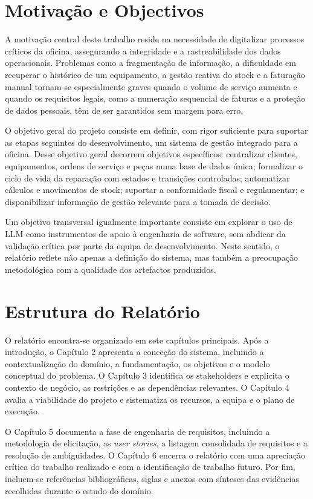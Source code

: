 \documentclass[a4paper,12pt]{scrreprt}
\begin{document}
    \section{Motivação e Objectivos}
        A motivação central deste trabalho reside na necessidade de digitalizar processos críticos da oficina, assegurando a integridade e a rastreabilidade dos dados operacionais. Problemas como a fragmentação de informação, a dificuldade em recuperar o histórico de um equipamento, a gestão reativa do stock e a faturação manual tornam-se especialmente graves quando o volume de serviço aumenta e quando os requisitos legais, como a numeração sequencial de faturas e a proteção de dados pessoais, têm de ser garantidos sem margem para erro.

        O objetivo geral do projeto consiste em definir, com rigor suficiente para suportar as etapas seguintes do desenvolvimento, um sistema de gestão integrado para a oficina. Desse objetivo geral decorrem objetivos específicos: centralizar clientes, equipamentos, ordens de serviço e peças numa base de dados única; formalizar o ciclo de vida da reparação com estados e transições controladas; automatizar cálculos e movimentos de stock; suportar a conformidade fiscal e regulamentar; e disponibilizar informação de gestão relevante para a tomada de decisão.

        Um objetivo transversal igualmente importante consiste em explorar o uso de LLM como instrumentos de apoio à engenharia de software, sem abdicar da validação crítica por parte da equipa de desenvolvimento. Neste sentido, o relatório reflete não apenas a definição do sistema, mas também a preocupação metodológica com a qualidade dos artefactos produzidos.
    \section{Estrutura do Relatório}
        O relatório encontra-se organizado em sete capítulos principais. Após a introdução, o Capítulo 2 apresenta a conceção do sistema, incluindo a contextualização do domínio, a fundamentação, os objetivos e o modelo conceptual do problema. O Capítulo 3 identifica os stakeholders e explicita o contexto de negócio, as restrições e as dependências relevantes. O Capítulo 4 avalia a viabilidade do projeto e sistematiza os recursos, a equipa e o plano de execução.

        O Capítulo 5 documenta a fase de engenharia de requisitos, incluindo a metodologia de elicitação, as \textit{user stories}, a listagem consolidada de requisitos e a resolução de ambiguidades. O Capítulo 6 encerra o relatório com uma apreciação crítica do trabalho realizado e com a identificação de trabalho futuro. Por fim, incluem-se referências bibliográficas, siglas e anexos com sínteses das evidências recolhidas durante o estudo do domínio.
\end{document}
